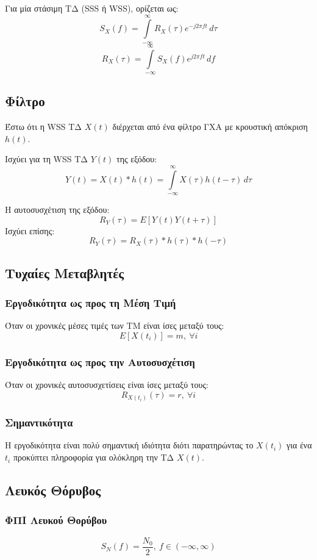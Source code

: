 \documentclass[a4paper,12pt]{article}
\begin{document}
Για μία στάσιμη ΤΔ (SSS ή WSS), ορίζεται ως:
\[
S_X(f)=\int\limits_{-\infty}^{\infty} R_X(\tau) e^{-j 2 \pi f t} \, d\tau
\]
\[
R_X(\tau)=\int\limits_{-\infty}^{\infty} S_X(f) e^{j 2 \pi f t} \, df
\]

\subsection*{Φίλτρο}
Έστω ότι η WSS ΤΔ \(X(t)\) διέρχεται από ένα φίλτρο ΓΧΑ με κρουστική απόκριση \(h(t)\).

Ισχύει για τη WSS ΤΔ \(Y(t)\) της εξόδου:
\[
Y(t)=X(t) \ast h(t)=\int\limits^\infty_{-\infty}X(\tau)h(t-\tau) \, d\tau
\]

Η αυτοσυσχέτιση της εξόδου:
\[
R_Y(\tau)=E[Y(t)Y(t+\tau)]
\]
Ισχύει επίσης:
\[
R_Y(\tau)=R_X(\tau) \ast h(\tau) \ast h(-\tau)
\]

\subsection*{Τυχαίες Μεταβλητές}
\subsubsection*{Εργοδικότητα ως προς τη Μέση Τιμή}
Όταν οι χρονικές μέσες τιμές των ΤΜ είναι ίσες μεταξύ τους:
\[
E[X(t_i)]=m, \ \forall i
\]

\subsubsection*{Εργοδικότητα ως προς την Αυτοσυσχέτιση}
Όταν οι χρονικές αυτοσυσχετίσεις είναι ίσες μεταξύ τους:
\[
R_{X(t_i)}(\tau)=r, \ \forall i
\]

\subsubsection*{Σημαντικότητα}
Η εργοδικότητα είναι πολύ σημαντική ιδιότητα διότι παρατηρώντας το \(X(t_i)\) για ένα \(t_i\) προκύπτει πληροφορία για ολόκληρη την ΤΔ \(X(t)\).

\subsection*{Λευκός Θόρυβος}
\subsubsection*{ΦΠΙ Λευκού Θορύβου}
\[
S_N(f)=\frac{N_0}{2}, \ f\in(-\infty,\infty)
\]
\end{document}
